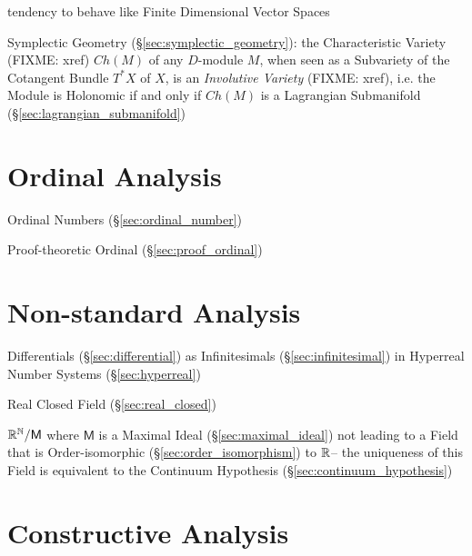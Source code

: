 tendency to behave like Finite Dimensional Vector Spaces

\fist Symplectic Geometry (\S\ref{sec:symplectic_geometry}): the Characteristic
Variety (FIXME: xref) $Ch(M)$ of any $D$-module $M$, when seen as a Subvariety
of the Cotangent Bundle $T^*X$ of $X$, is an \emph{Involutive Variety} (FIXME:
xref), i.e. the Module is Holonomic if and only if $Ch(M)$ is a Lagrangian
Submanifold (\S\ref{sec:lagrangian_submanifold})



\section{Ordinal Analysis}\label{sec:ordinal_analysis}

Ordinal Numbers (\S\ref{sec:ordinal_number})

Proof-theoretic Ordinal (\S\ref{sec:proof_ordinal})



\section{Non-standard Analysis}\label{sec:nonstandard_analysis}

Differentials (\S\ref{sec:differential}) as Infinitesimals
(\S\ref{sec:infinitesimal}) in Hyperreal Number Systems (\S\ref{sec:hyperreal})

Real Closed Field (\S\ref{sec:real_closed})

$\mathbb{R}^{\mathbb{N}} / \mathsf{M}$ where $\mathsf{M}$ is a Maximal Ideal
(\S\ref{sec:maximal_ideal}) not leading to a Field that is
Order-isomorphic (\S\ref{sec:order_isomorphism}) to $\mathbb{R}$-- the
uniqueness of this Field is equivalent to the Continuum Hypothesis
(\S\ref{sec:continuum_hypothesis})



\section{Constructive Analysis}\label{sec:constructive_analysis}

